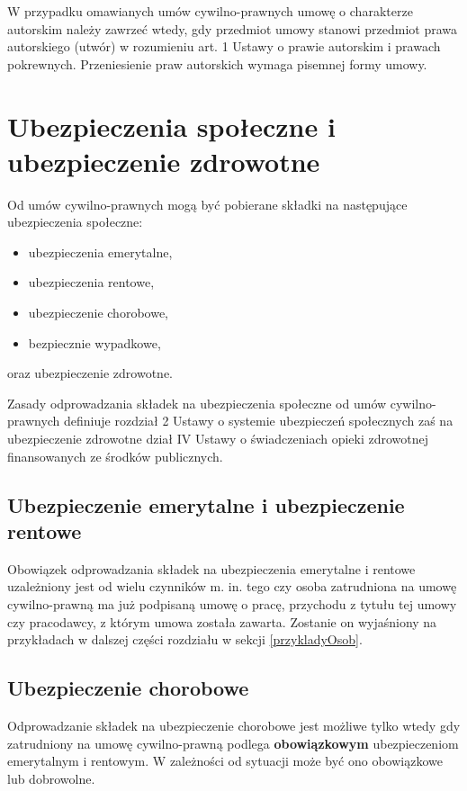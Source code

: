 W przypadku omawianych umów cywilno-prawnych umowę o charakterze autorskim należy zawrzeć wtedy, gdy przedmiot umowy stanowi przedmiot prawa autorskiego (utwór) w rozumieniu art. 1 Ustawy o prawie autorskim i prawach pokrewnych\cite{ustawaOPrawieAutorskim}. Przeniesienie praw autorskich wymaga pisemnej formy umowy.

\section[Ubezpieczenia społeczne i ubezpieczenie zdrowotne][Ubezpieczenia społeczne i ubezpieczenie zdrowotne]{Ubezpieczenia społeczne i ubezpieczenie zdrowotne}
Od umów cywilno-prawnych mogą być pobierane składki na następujące ubezpieczenia społeczne:

	\begin{itemize}
		\item ubezpieczenia emerytalne,
		\item ubezpieczenia rentowe,
		\item ubezpieczenie chorobowe,
		\item bezpiecznie wypadkowe,
	\end{itemize}
oraz ubezpieczenie zdrowotne.

Zasady odprowadzania składek na ubezpieczenia społeczne od umów cywilno-prawnych definiuje rozdział 2 Ustawy o systemie ubezpieczeń społecznych\cite{ustawaOSystemieUbezpieczen} zaś na ubezpieczenie zdrowotne dział IV Ustawy o świadczeniach opieki zdrowotnej finansowanych ze środków publicznych\cite{ustawaOSwiadczeniachOpieki}.

\subsection[Ubezpieczenie emerytalne i ubezpieczenie rentowe][Ubezpieczenie emerytalne i ubezpieczenie rentowe]{Ubezpieczenie emerytalne i ubezpieczenie rentowe}
Obowiązek odprowadzania składek na ubezpieczenia emerytalne i rentowe uzależniony jest od wielu czynników m. in. tego czy osoba zatrudniona na umowę cywilno-prawną ma już podpisaną umowę o pracę, przychodu z tytułu tej umowy czy pracodawcy, z którym umowa została zawarta. Zostanie on wyjaśniony na przykładach w dalszej części rozdziału w sekcji \ref{przykladyOsob}.

\subsection[Ubezpieczenie chorobowe][Ubezpieczenie chorobowe]{Ubezpieczenie chorobowe}
Odprowadzanie składek na ubezpieczenie chorobowe jest możliwe tylko wtedy gdy zatrudniony na umowę cywilno-prawną podlega \textbf{obowiązkowym} ubezpieczeniom emerytalnym i rentowym. W zależności od sytuacji może być ono obowiązkowe lub dobrowolne.

